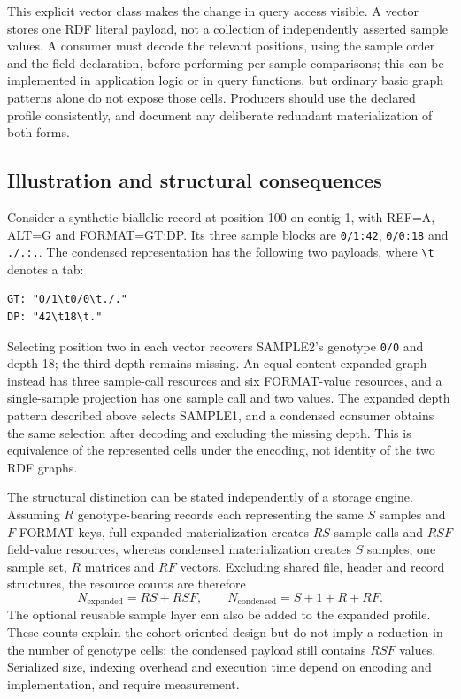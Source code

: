 \documentclass{ceurart}
\newcommand{\term}[1]{\texttt{#1}}
\begin{document}
This explicit vector class makes the change in query access visible. A vector stores one RDF literal payload, not a collection of independently asserted sample values. A consumer must decode the relevant positions, using the sample order and the field declaration, before performing per-sample comparisons; this can be implemented in application logic or in query functions, but ordinary basic graph patterns alone do not expose those cells. Producers should use the declared profile consistently, and document any deliberate redundant materialization of both forms.

\subsection{Illustration and structural consequences}

Consider a synthetic biallelic record at position 100 on contig 1, with REF=A, ALT=G and FORMAT=GT:DP. Its three sample blocks are \term{0/1:42}, \term{0/0:18} and \term{./.:.}. The condensed representation has the following two payloads, where \term{\textbackslash t} denotes a tab:

\begin{lstlisting}
GT: "0/1\t0/0\t./."
DP: "42\t18\t."
\end{lstlisting}

Selecting position two in each vector recovers SAMPLE2's genotype \term{0/0} and depth 18; the third depth remains missing. An equal-content expanded graph instead has three sample-call resources and six FORMAT-value resources, and a single-sample projection has one sample call and two values. The expanded depth pattern described above selects SAMPLE1, and a condensed consumer obtains the same selection after decoding and excluding the missing depth. This is equivalence of the represented cells under the encoding, not identity of the two RDF graphs.

The structural distinction can be stated independently of a storage engine. Assuming $R$ genotype-bearing records each representing the same $S$ samples and $F$ FORMAT keys, full expanded materialization creates $RS$ sample calls and $RSF$ field-value resources, whereas condensed materialization creates $S$ samples, one sample set, $R$ matrices and $RF$ vectors. Excluding shared file, header and record structures, the resource counts are therefore
\[
N_{\mathrm{expanded}}=RS+RSF,\qquad
N_{\mathrm{condensed}}=S+1+R+RF.
\]
The optional reusable sample layer can also be added to the expanded profile. These counts explain the cohort-oriented design but do not imply a reduction in the number of genotype cells: the condensed payload still contains $RSF$ values. Serialized size, indexing overhead and execution time depend on encoding and implementation, and require measurement.
\end{document}
